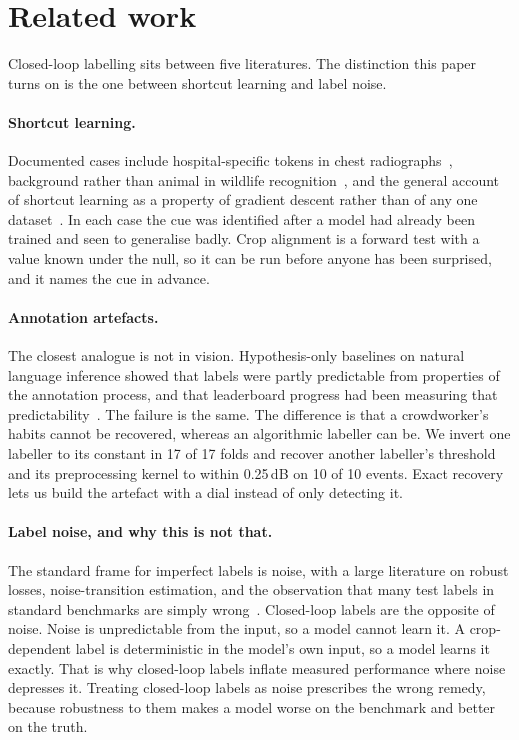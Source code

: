 \section{Related work}
\label{sec:related}

Closed-loop labelling sits between five literatures. The distinction this paper
turns on is the one between shortcut learning and label noise.

\paragraph{Shortcut learning.} Documented cases include
hospital-specific tokens in chest radiographs~\cite{zech2018variable}, background
rather than animal in wildlife recognition~\cite{beery2018terra}, and the general
account of shortcut learning as a property of gradient descent rather than of any
one dataset~\cite{geirhos2020shortcut, lapuschkin2019unmasking}. In each case the cue was identified after a model had already been trained and seen
to generalise badly. Crop alignment is a forward test with a value known under the
null, so it can be run before anyone has been surprised, and it names the cue in
advance.

\paragraph{Annotation artefacts.} The closest analogue is not in vision.
Hypothesis-only baselines on natural language inference showed that labels were
partly predictable from properties of the annotation process, and that leaderboard
progress had been measuring that predictability~\cite{gururangan2018annotation,
poliak2018hypothesis}. The failure is the same. The difference is that a
crowdworker's habits cannot be recovered, whereas an algorithmic labeller can be. We
invert one labeller to its constant in 17 of 17 folds and recover another labeller's
threshold and its preprocessing kernel to within 0.25\,dB on 10 of 10
events. Exact recovery lets us build the artefact with a dial instead of only detecting
it.

\paragraph{Label noise, and why this is not that.} The standard frame for imperfect
labels is noise, with a large literature on robust losses, noise-transition
estimation, and the observation that many test labels in standard benchmarks are
simply wrong~\cite{song2022learning, northcutt2021confident,
northcutt2021pervasive}. Closed-loop labels are the opposite of noise. Noise is
unpredictable from the input, so a model cannot learn it. A crop-dependent label is
deterministic in the model's own input, so a model learns it exactly. That is why
closed-loop labels inflate measured performance where noise depresses it. Treating closed-loop labels as noise
prescribes the wrong remedy, because robustness to them makes a model worse on the
benchmark and better on the truth.

